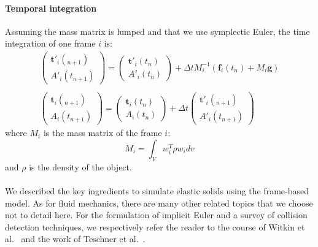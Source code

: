 \paragraph{Temporal integration}
Assuming the mass matrix is lumped and that we use symplectic Euler, the time integration of one frame $i$ is:
\begin{equation}
\displaystyle
\begin{array}{l}
\begin{pmatrix}
\mathbf{t'}_{i}(_{n+1}) \\
A'_{i}(t_{n+1})
\end{pmatrix} 
=
\begin{pmatrix}
\mathbf{t'}_{i}(t_{n}) \\
A'_{i}(t_{n})
\end{pmatrix} 
+
\Delta t
M_{i}^{-1}
\left(\mathbf{f}_{i}(t_{n}) + M_{i}\mathbf{g} \right)
\\ \\
\begin{pmatrix}
\mathbf{t}_{i}(_{n+1}) \\
A_{i}(t_{n+1})
\end{pmatrix} 
=
\begin{pmatrix}
\mathbf{t}_{i}(t_{n}) \\
A_{i}(t_{n})
\end{pmatrix} 
+
\Delta t
\begin{pmatrix}
\mathbf{t'}_{i}(_{n+1}) \\ A'_{i}(t_{n+1})
\end{pmatrix} 
\end{array}
\end{equation}
where $M_{i}$ is the mass matrix of the frame $i$:
\begin{equation}
\label{eq:massMatrix}
M_{i} = \int_{V} w_{i}^{T} \rho w_{i} dv
\end{equation}
and $\rho$ is the density of the object.
\\ \\
We described the key ingredients to simulate elastic solids using the frame-based model.
As for fluid mechanics, there are many other related topics that we choose not to detail here.
For the formulation of implicit Euler and a survey of collision detection techniques, we respectively refer the reader to the course of Witkin et al.~\cite{Witkin2001} and the work of Teschner et al.~\cite{Teschner2005}.

